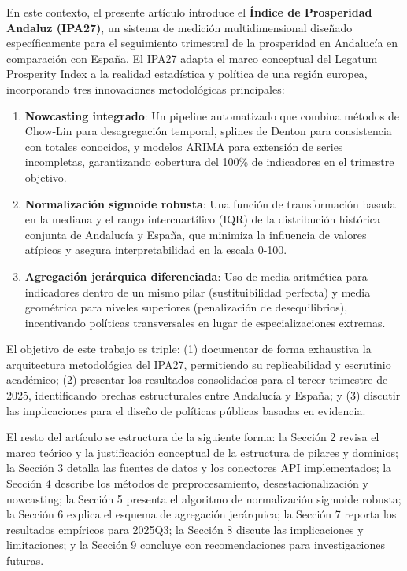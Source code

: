 \documentclass[authoryear,12pt]{elsarticle}
\begin{document}
En este contexto, el presente artículo introduce el \textbf{Índice de Prosperidad Andaluz (IPA27)}, un sistema de medición multidimensional diseñado específicamente para el seguimiento trimestral de la prosperidad en Andalucía en comparación con España. El IPA27 adapta el marco conceptual del Legatum Prosperity Index a la realidad estadística y política de una región europea, incorporando tres innovaciones metodológicas principales:

\begin{enumerate}
    \item \textbf{Nowcasting integrado}: Un pipeline automatizado que combina métodos de Chow-Lin para desagregación temporal, splines de Denton para consistencia con totales conocidos, y modelos ARIMA para extensión de series incompletas, garantizando cobertura del 100\% de indicadores en el trimestre objetivo.

    \item \textbf{Normalización sigmoide robusta}: Una función de transformación basada en la mediana y el rango intercuartílico (IQR) de la distribución histórica conjunta de Andalucía y España, que minimiza la influencia de valores atípicos y asegura interpretabilidad en la escala 0-100.

    \item \textbf{Agregación jerárquica diferenciada}: Uso de media aritmética para indicadores dentro de un mismo pilar (sustituibilidad perfecta) y media geométrica para niveles superiores (penalización de desequilibrios), incentivando políticas transversales en lugar de especializaciones extremas.
\end{enumerate}

El objetivo de este trabajo es triple: (1) documentar de forma exhaustiva la arquitectura metodológica del IPA27, permitiendo su replicabilidad y escrutinio académico; (2) presentar los resultados consolidados para el tercer trimestre de 2025, identificando brechas estructurales entre Andalucía y España; y (3) discutir las implicaciones para el diseño de políticas públicas basadas en evidencia.

El resto del artículo se estructura de la siguiente forma: la Sección 2 revisa el marco teórico y la justificación conceptual de la estructura de pilares y dominios; la Sección 3 detalla las fuentes de datos y los conectores API implementados; la Sección 4 describe los métodos de preprocesamiento, desestacionalización y nowcasting; la Sección 5 presenta el algoritmo de normalización sigmoide robusta; la Sección 6 explica el esquema de agregación jerárquica; la Sección 7 reporta los resultados empíricos para 2025Q3; la Sección 8 discute las implicaciones y limitaciones; y la Sección 9 concluye con recomendaciones para investigaciones futuras.
\end{document}
